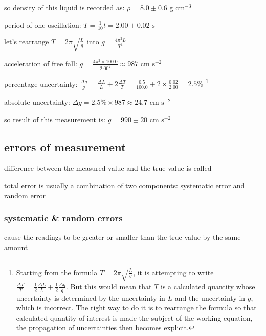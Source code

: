 so density of this liquid is recorded as: $\rho = 8.0 \pm 0.6 \text{ g cm}^{-3}$ \eoe


\sol period of one oscillation: $T = \frac{1}{10}t = 2.00 \pm 0.02 \text{ s}$

let's rearrange $T=2\pi\sqrt{\frac{L}{g}}$ into $g = \frac{4\pi^2L}{T^2}$

acceleration of free fall: $g = \frac{4\pi^2 \times 100.0}{2.00^2} \approx 987 \text{ cm s}^{-2}$

\eqyskip percentage uncertainty: $\frac{\Delta g}{g} = \frac{\Delta L}{L} + 2\frac{\Delta T}{T} = \frac{0.5}{100.0} + 2\times\frac{0.02}{2.00} = 2.5\%$ \footnote{Starting from the formula $T=2\pi\sqrt{\frac{L}{g}}$, it is attempting to write $\frac{\Delta T}{T} = \frac{1}{2}\frac{\Delta L}{L} + \frac{1}{2}\frac{\Delta g}{g}$. But this would mean that $T$ is a calculated quantity whose uncertainty is determined by the uncertainty in $L$ and the uncertainty in $g$, which is incorrect. The right way to do it is to rearrange the formula so that calculated quantity of interest is made the subject of the working equation, the propagation of uncertainties then becomes explicit.}

absolute uncertainty: $\Delta g = 2.5\% \times 987 \approx 24.7 \text{ cm s}^{-2}$

so result of this measurement is: $ g = 990 \pm 20 \text{ cm s}^{-2}$ \eoe




\subsection{errors of measurement}

difference between the measured value and the true value is called 

total error is usually a combination of two components: systematic error and random error

\subsubsection{systematic \& random errors}

\begin{ilight}
	 cause the readings to be greater or smaller than the true value by the same amount
\end{ilight}

